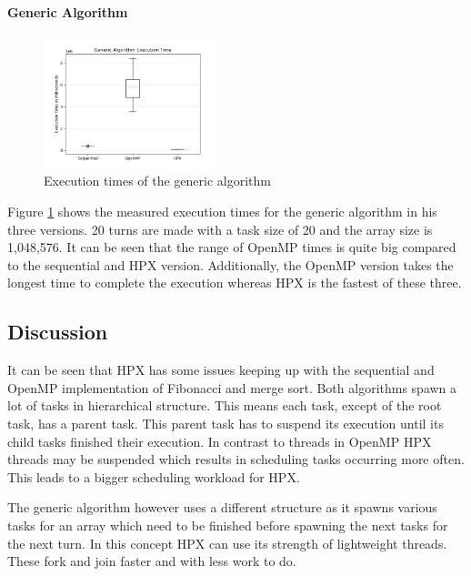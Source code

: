 \paragraph{Generic Algorithm}
  \begin{figure}[htbp]
	\centering
	\includegraphics[width=0.45\textwidth]{figures/generic_NoOp.png}
	\caption{Execution times of the generic algorithm}
	\label{fig:gen_NoOp}
\end{figure}
Figure \ref{fig:gen_NoOp} shows the measured execution times for the generic algorithm in his three versions.
20 turns are made with a task size of 20 and the array size is 1,048,576.
It can be seen that the range of OpenMP times is quite big compared to the sequential and HPX version.
Additionally, the OpenMP version takes the longest time to complete the execution whereas HPX is the fastest of these three. 

\subsection{Discussion}
It can be seen that HPX has some issues keeping up with the sequential and OpenMP implementation of Fibonacci and merge sort.
Both algorithms spawn a lot of tasks in hierarchical structure.
This means each task, except of the root task, has a parent task.
This parent task has to suspend its execution until its child tasks finished their execution.
In contrast to threads in OpenMP HPX threads may be suspended which results in scheduling tasks occurring more often.
This leads to a bigger scheduling workload for HPX.

The generic algorithm however uses a different structure as it spawns various tasks for an array which need to be finished before spawning the next tasks for the next turn.
In this concept HPX can use its strength of lightweight threads.
These fork and join faster and with less work to do.

